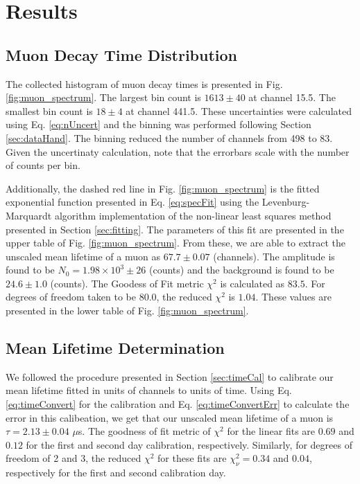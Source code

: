 \documentclass[
    aps, 
    twocolumn, 
    secnumarabic, 
    balancelastpage, 
    amsmath, 
    amssymb, 
    nofootinbib, 
    floatfix
]{revtex4-2}
\begin{document}
\section{Results}

\subsection{Muon Decay Time Distribution}
\label{sec:muonDistResult}

The collected histogram of muon decay times is presented in Fig. \ref{fig:muon_spectrum}. The largest bin count is $1613 \pm 40$ at channel 15.5. The smallest bin count is $18 \pm 4$ at channel 441.5. These uncertainties were calculated using Eq. \eqref{eq:nUncert} and the binning was performed following Section \ref{sec:dataHand}. The binning reduced the number of channels from 498 to 83. Given the uncertinaty calculation, note that the errorbars scale with the number of counts per bin. 

Additionally, the dashed red line in Fig. \ref{fig:muon_spectrum} is the fitted exponential function presented in Eq. \eqref{eq:specFit} using the Levenburg-Marquardt algorithm implementation of the non-linear least squares method presented in Section \ref{sec:fitting}. The parameters of this fit are presented in the upper table of Fig. \ref{fig:muon_spectrum}. From these, we are able to extract the unscaled mean lifetime of a muon as $67.7 \pm 0.07$ (channels). The amplitude is found to be $N_0 = 1.98 \times 10^3 \pm 26$ (counts) and the background is found to be $24.6 \pm 1.0$ (counts). The Goodess of Fit metric $\chi^2$ is calculated as $83.5$. For degrees of freedom taken to be $80.0$, the reduced $\chi^2$ is $1.04$. These values are presented in the lower table of Fig. \ref{fig:muon_spectrum}.   

\subsection{Mean Lifetime Determination}

We followed the procedure presented in Section \ref{sec:timeCal} to calibrate our mean lifetime fitted in units of channels to units of time. Using Eq. \eqref{eq:timeConvert} for the calibration and Eq. \eqref{eq:timeConvertErr} to calculate the error in this calibeation, we get that our unscaled mean lifetime of a muon is $\tau = 2.13 \pm 0.04$ $\mu$s. The goodness of fit metric of $\chi^2$ for the linear fits are $0.69$ and $0.12$ for the first and second day calibration, respectively. Similarly, for degrees of freedom of 2 and 3, the reduced $\chi^2$ for these fits are $\chi^2_\nu = 0.34$ and $0.04$, respectively for the first and second calibration day.
\end{document}
